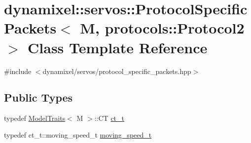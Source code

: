 \hypertarget{classdynamixel_1_1servos_1_1_protocol_specific_packets_3_01_m_00_01protocols_1_1_protocol2_01_4}{}\section{dynamixel\+:\+:servos\+:\+:Protocol\+Specific\+Packets$<$ M, protocols\+:\+:Protocol2 $>$ Class Template Reference}
\label{classdynamixel_1_1servos_1_1_protocol_specific_packets_3_01_m_00_01protocols_1_1_protocol2_01_4}


{\ttfamily \#include $<$dynamixel/servos/protocol\+\_\+specific\+\_\+packets.\+hpp$>$}

\subsection*{Public Types}
\begin{DoxyCompactItemize}
\item 
typedef \hyperlink{structdynamixel_1_1servos_1_1_model_traits}{Model\+Traits}$<$ M $>$\+::C\+T \hyperlink{classdynamixel_1_1servos_1_1_protocol_specific_packets_3_01_m_00_01protocols_1_1_protocol2_01_4_a145dc648f17fe5d401b917095a28e13f}{ct\+\_\+t}
\item 
typedef ct\+\_\+t\+::moving\+\_\+speed\+\_\+t \hyperlink{classdynamixel_1_1servos_1_1_protocol_specific_packets_3_01_m_00_01protocols_1_1_protocol2_01_4_a8772c5840284f3a4f63b31f439084ab0}{moving\+\_\+speed\+\_\+t}
\end{DoxyCompactItemize}
